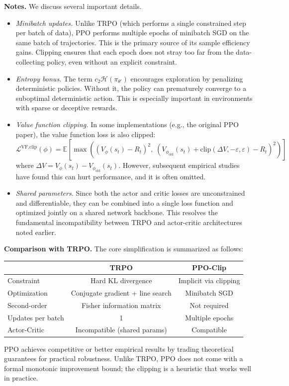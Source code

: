 \documentclass[11pt, letterpaper]{article}
\begin{document}
\begin{remark}
    \textbf{Notes.} We discuss several important details. 
    \begin{itemize}
        \item \textit{Minibatch updates.} Unlike TRPO (which performs a single constrained step per batch of data), PPO performs multiple epochs of minibatch SGD on the same batch of trajectories. This is the primary source of its sample efficiency gains. Clipping ensures that each epoch does not stray too far from the data-collecting policy, even without an explicit constraint. 
        \item \textit{Entropy bonus.} The term \(c_2 \mathcal{H}(\pi_{\theta'})\) encourages exploration by penalizing deterministic policies. Without it, the policy can prematurely converge to a suboptimal deterministic action. This is especially important in environments with sparse or deceptive rewards.
        \item \textit{Value function clipping.} In some implementations (e.g., the original PPO paper), the value function loss is also clipped: 
        \[
            \mathcal{L}^{\text{VF,clip}}(\phi) = \mathbb{E}\left[\max\left((V_\phi(s_t) - R_t)^2,\; (V_{\phi_{\text{old}}}(s_t) + \text{clip}(\Delta V, -\varepsilon, \varepsilon) - R_t)^2\right)\right]
        \]
        where \(\Delta V = V_\phi(s_t) - V_{\phi_{\text{old}}}(s_t)\). However, subsequent empirical studies have found this can hurt performance, and it is often omitted. 
        \item \textit{Shared parameters.} Since both the actor and critic losses are unconstrained and differentiable, they can be combined into a single loss function and optimized jointly on a shared network backbone. This resolves the fundamental incompatibility between TRPO and actor-critic architectures noted earlier. 
    \end{itemize}

    \textbf{Comparison with TRPO.} The core simplification is summarized as follows: 
    \begin{center}
    \begin{tabular}{lcc}
        & \textbf{TRPO} & \textbf{PPO-Clip} \\
        \hline
        Constraint & Hard KL divergence & Implicit via clipping \\
        Optimization & Conjugate gradient + line search & Minibatch SGD \\
        Second-order & Fisher information matrix & Not required \\
        Updates per batch & 1 & Multiple epochs \\
        Actor-Critic & Incompatible (shared params) & Compatible \\
    \end{tabular}
    \end{center}
    PPO achieves competitive or better empirical results by trading theoretical guarantees for practical robustness. Unlike TRPO, PPO does not come with a formal monotonic improvement bound; the clipping is a heuristic that works well in practice. 
\end{remark}
\end{document}
